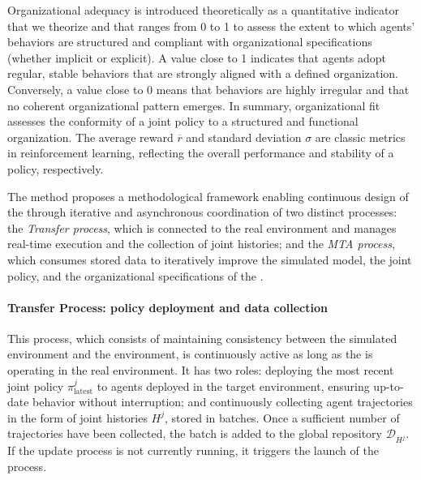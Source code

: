 Organizational adequacy is introduced theoretically as a quantitative indicator that we theorize and that ranges from 0 to 1 to assess the extent to which agents' behaviors are structured and compliant with organizational specifications (whether implicit or explicit). A value close to 1 indicates that agents adopt regular, stable behaviors that are strongly aligned with a defined organization. Conversely, a value close to 0 means that behaviors are highly irregular and that no coherent organizational pattern emerges. In summary, organizational fit assesses the conformity of a joint policy to a structured and functional organization.
The average reward $\overline{r}$ and standard deviation $\sigma$ are classic metrics in reinforcement learning, reflecting the overall performance and stability of a policy, respectively.


The  method proposes a methodological framework enabling continuous design of the  through iterative and asynchronous coordination of two distinct processes: the \textit{Transfer process}, which is connected to the real environment and manages real-time execution and the collection of joint histories; and the \textit{MTA process}, which consumes stored data to iteratively improve the simulated model, the joint policy, and the organizational specifications of the .

\paragraph{Transfer Process: policy deployment and data collection}

This process, which consists of maintaining consistency between the simulated environment and the environment, is continuously active as long as the  is operating in the real environment. It has two roles: deploying the most recent joint policy $\pi^j_{\text{latest}}$ to agents deployed in the target environment, ensuring up-to-date behavior without interruption; and continuously collecting agent trajectories in the form of joint histories $H^j$, stored in batches. Once a sufficient number of trajectories have been collected, the batch is added to the global repository $\mathcal {D}_{H^j}$. If the update process is not currently running, it triggers the launch of the  process.


